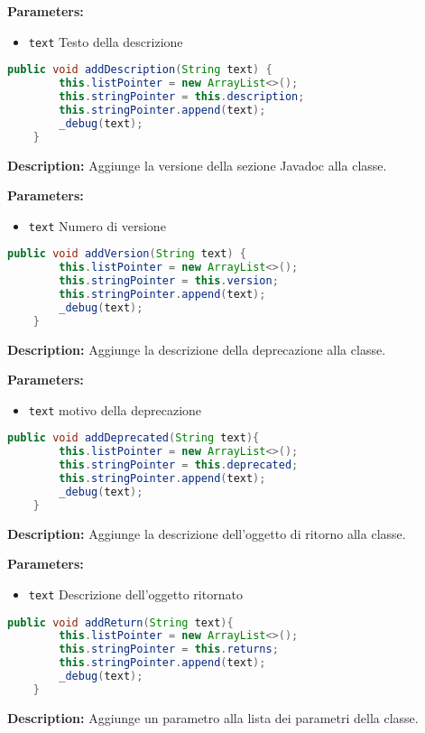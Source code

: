 \documentclass{article}
\begin{document}
\textbf{Parameters:}
\begin{itemize}
  \item\texttt{text} Testo della descrizione
\end{itemize}

\begin{lstlisting}[language=Java]
    public void addDescription(String text) {
        this.listPointer = new ArrayList<>();
        this.stringPointer = this.description;
        this.stringPointer.append(text);
        _debug(text);
    }
\end{lstlisting}
\vspace{0.5cm}
\textbf{Description:}  Aggiunge la versione della sezione Javadoc alla classe. 

\textbf{Parameters:}
\begin{itemize}
  \item\texttt{text} Numero di versione
\end{itemize}

\begin{lstlisting}[language=Java]
    public void addVersion(String text) {
        this.listPointer = new ArrayList<>();
        this.stringPointer = this.version;
        this.stringPointer.append(text);
        _debug(text);
    }
\end{lstlisting}
\vspace{0.5cm}
\textbf{Description:}  Aggiunge la descrizione della deprecazione alla classe. 

\textbf{Parameters:}
\begin{itemize}
  \item\texttt{text} motivo della deprecazione
\end{itemize}

\begin{lstlisting}[language=Java]
    public void addDeprecated(String text){
        this.listPointer = new ArrayList<>();
        this.stringPointer = this.deprecated;
        this.stringPointer.append(text);
        _debug(text);
    }
\end{lstlisting}
\vspace{0.5cm}
\textbf{Description:}  Aggiunge la descrizione dell'oggetto di ritorno alla classe. 

\textbf{Parameters:}
\begin{itemize}
  \item\texttt{text} Descrizione dell'oggetto ritornato
\end{itemize}

\begin{lstlisting}[language=Java]
    public void addReturn(String text){
        this.listPointer = new ArrayList<>();
        this.stringPointer = this.returns;
        this.stringPointer.append(text);
        _debug(text);
    }
\end{lstlisting}
\vspace{0.5cm}
\textbf{Description:}  Aggiunge un parametro alla lista dei parametri della classe. 
\end{document}
